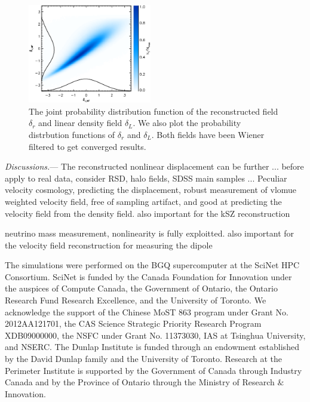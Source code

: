 \documentclass[aps,prd,twocolumn,showpacs,superscriptaddress,groupedaddress,nofootinbib]{revtex4}  %
\begin{document}
\begin{figure}[tbp]
\begin{center}
\includegraphics[width=0.48\textwidth]{pdfwf-b.eps}
\end{center}
\vspace{-0.7cm}
\caption{The joint probability distribution function of the reconstructed field 
    $\delta_r$ and linear density field $\delta_L$. We also plot the 
probability distrbution functions of $\delta_r$ and $\delta_L$. Both fields
have been Wiener filtered to get converged results.}
\label{fig:pdf}
\end{figure}

{\it Discussions.}---
The reconstructed nonlinear displacement can be further ...
before apply to real data, consider RSD, halo fields, SDSS main samples ...
Peculiar velocity cosmology, predicting the displacement, robust measurement of
vlomue weighted velocity field, free of sampling artifact, and good at 
predicting the velocity field from the density field. also important for the
kSZ reconstruction

neutrino mass measurement, nonlinearity is fully exploitted. also important for
the velocity field reconstruction for measuring the dipole


The simulations were performed on the BGQ supercomputer at the SciNet HPC 
Consortium. SciNet is funded by the Canada Foundation for Innovation under 
the auspices of Compute Canada, the Government of Ontario, the Ontario Research 
Fund Research Excellence, and the University of Toronto.
We acknowledge the support of the Chinese MoST 863 program under Grant 
No. 2012AA121701, the CAS Science Strategic Priority Research Program 
XDB09000000, the NSFC under Grant No. 11373030, IAS at Tsinghua University, 
 and NSERC.
The Dunlap Institute is funded through an endowment established by the David Dunlap family and the University of Toronto.
Research at the Perimeter Institute is supported by the Government of Canada
through Industry Canada and by the Province of Ontario through the Ministry of
Research $\&$ Innovation.



\end{document}
